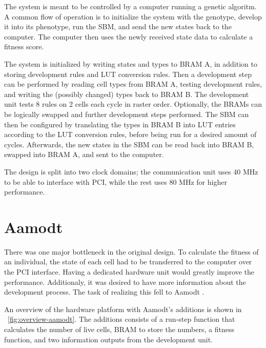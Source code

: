 The system is meant to be controlled by a computer running a genetic algoritm.
A common flow of operation is to initialize the system with the genotype, develop it into its phenotype, run the SBM, and send the new states back to the computer.
The computer then uses the newly received state data to calculate a fitness score.

The system is initialized by writing states and types to BRAM A, in addition to storing development rules and LUT conversion rules.
Then a development step can be performed by reading cell types from BRAM A\footnotemark, testing development rules, and writing the (possibly changed) types back to BRAM B.
The development unit tests 8 rules on 2 cells each cycle in raster order.
Optionally, the BRAMs can be logically swapped and further development steps performed.
The SBM can then be configured by translating the types in BRAM B into LUT entries according to the LUT conversion rules, before being run for a desired amount of cycles.
Afterwards, the new states in the SBM can be read back into BRAM B, swapped into BRAM A, and sent to the computer.

The design is split into two clock domains; the communication unit uses 40 MHz to be able to interface with PCI, while the rest uses 80 MHz for higher performance.


\section{Aamodt}

There was one major bottleneck in the original design.
To calculate the fitness of an individual, the state of each cell had to be transferred to the computer over the PCI interface.
Having a dedicated hardware unit would greatly improve the performance.
Additionaly, it was desired to have more information about the development process.
The task of realizing this fell to Aamodt \cite{aamodt2005sblock}.

An overview of the hardware platform with Aamodt's additions is shown in \figurename~\ref{fig:overview-aamodt}.
The additions consists of a run-step function that calculates the number of live cells, BRAM to store the numbers, a fitness function, and two information outputs from the development unit.

